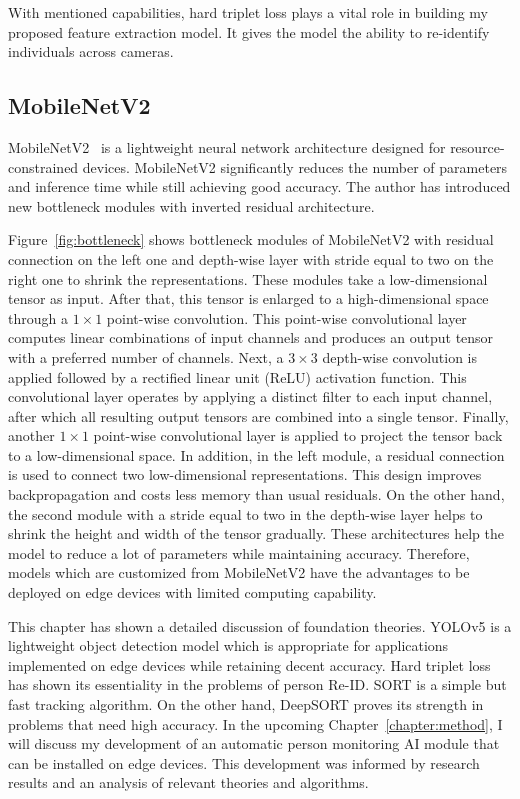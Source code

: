 \documentclass[../main.tex]{subfiles}
\begin{document}
With mentioned capabilities, hard triplet loss plays a vital role in building my proposed feature extraction model. It gives the model the ability to re-identify individuals across cameras.

\subsection{MobileNetV2}
\label{sec:mbv2}
MobileNetV2~\cite{sandler2018mobilenetv2} is a lightweight neural network architecture designed for resource-constrained devices. MobileNetV2 significantly reduces the number of parameters and inference time while still achieving good accuracy. The author has introduced new bottleneck modules with inverted residual architecture.

Figure~\ref{fig:bottleneck} shows bottleneck modules of MobileNetV2 with residual connection on the left one and depth-wise layer with stride equal to two on the right one to shrink the representations. These modules take a low-dimensional tensor as input. After that, this tensor is enlarged to a high-dimensional space through a $1\times1$ point-wise convolution. This point-wise convolutional layer computes linear combinations of input channels and produces an output tensor with a preferred number of channels. Next, a $3\times3$ depth-wise convolution is applied followed by a rectified linear unit (ReLU) activation function. This convolutional layer operates by applying a distinct filter to each input channel, after which all resulting output tensors are combined into a single tensor. Finally, another $1\times1$ point-wise convolutional layer is applied to project the tensor back to a low-dimensional space. In addition, in the left module, a residual connection is used to connect two low-dimensional representations. This design improves backpropagation and costs less memory than usual residuals. On the other hand, the second module with a stride equal to two in the depth-wise layer helps to shrink the height and width of the tensor gradually. These architectures help the model to reduce a lot of parameters while maintaining accuracy. Therefore, models which are customized from MobileNetV2 have the advantages to be deployed on edge devices with limited computing capability.

This chapter has shown a detailed discussion of foundation theories. YOLOv5 is a lightweight object detection model which is appropriate for applications implemented on edge devices while retaining decent accuracy. Hard triplet loss has shown its essentiality in the problems of person Re-ID. SORT is a simple but fast tracking algorithm. On the other hand, DeepSORT proves its strength in problems that need high accuracy. In the upcoming Chapter~\ref{chapter:method}, I will discuss my development of an automatic person monitoring AI module that can be installed on edge devices. This development was informed by research results and an analysis of relevant theories and algorithms.
\end{document}
